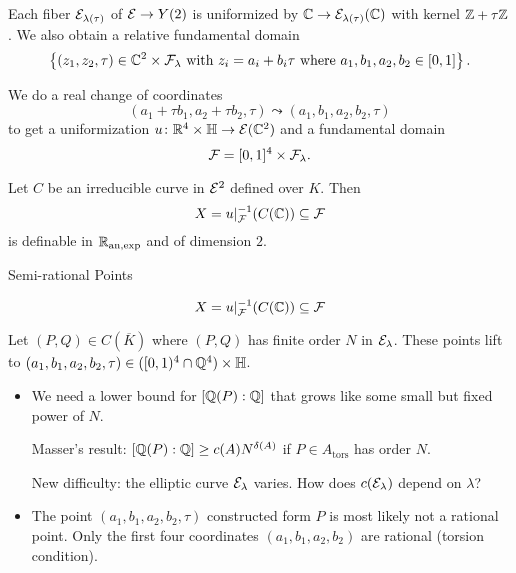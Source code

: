 \documentclass{beamer}
\begin{document}
\begin{frame}
  Each fiber ${\mathcal E}_{\lambda(\tau)}$ of ${\mathcal E}\rightarrow Y(2)$ is
  uniformized by ${\mathbb{C}}\rightarrow {\mathcal E}_{\lambda(\tau)}({\mathbb{C}})$ with kernel
  ${\mathbb{Z}}+\tau{\mathbb{Z}}$.
  We also obtain a relative fundamental domain
  \begin{equation*}
     \left\{(z_1,z_2,\tau) \in
    {\mathbb{C}}^2\times {\mathcal F}_{\lambda} \text{ with }z_i=a_i+b_i\tau\text{
      where }a_1,b_1,a_2,b_2\in [0,1]  \right\}. 
  \end{equation*}

  We do a real change of coordinates
  $$ (a_1+\tau b_1,a_2 + \tau
  b_2,\tau)\leadsto (a_1,b_1,a_2,b_2,\tau)$$
  to get a uniformization $u\colon{\mathbb{R}}^4 \times {\mathbb{H}}\rightarrow{\mathcal E}({\mathbb{C}}^2)$
  and a fundamental domain
  \begin{equation*}
    {\mathcal F} = [0,1]^4\times {\mathcal F}_{\lambda}. 
  \end{equation*}

  Let $C$ be an irreducible curve in ${\mathcal E}^2$ defined over $K$. Then
  \begin{equation*}
    X = u|_{{\mathcal F}}^{-1}(C({\mathbb{C}})) \subseteq {\mathcal F}
  \end{equation*}
  is definable in ${{\mathbb{R}}_{\mathrm{an,exp}}}$ and of dimension $2$. 
\end{frame}


\begin{frame}{Semi-rational Points}
  
  \begin{equation*}
    X = u|_{{\mathcal F}}^{-1}(C({\mathbb{C}})) \subseteq {\mathcal F}
  \end{equation*}

  Let $(P,Q) \in C(\overline K)$ where $(P,Q)$ has finite order $N$
  in ${\mathcal E}_\lambda$. 
  These points lift to $(a_1,b_1,a_2,b_2,\tau)\in
  ([0,1)^4\cap{\mathbb{Q}}^4)\times{\mathbb{H}}$.

  
  \begin{itemize}
  \item  We need a lower bound for $[{\mathbb{Q}}(P):{\mathbb{Q}}]$ that grows like
    some small but fixed power of $N$.

    Masser's result: $[{\mathbb{Q}}(P):{\mathbb{Q}}] \ge c(A) N^{\delta(A)}$ if
    $P\in A_{\mathrm{tors}}$ has order $N$. 

    New difficulty: the
    elliptic curve ${\mathcal E}_{\lambda}$ \alert{varies}. How does
    $c({\mathcal E}_{\lambda})$ depend on $\lambda$?
    
  \item The point $(a_1,b_1,a_2,b_2,\tau)$ constructed form $P$ is
    most likely
    \alert{not} a rational point. Only the first four
    coordinates $(a_1,b_1,a_2,b_2)$ are rational
    (torsion condition).
  \end{itemize}
\end{frame}
\end{document}
